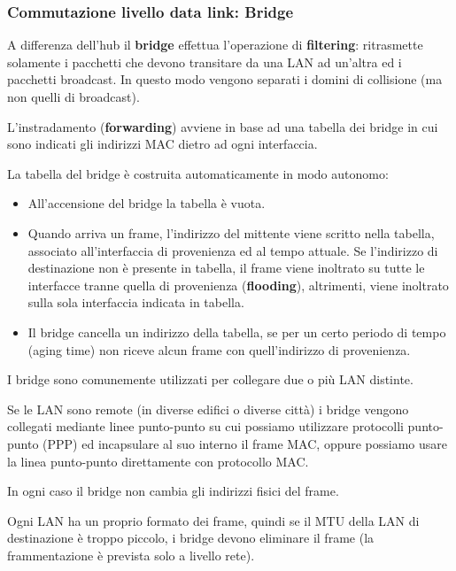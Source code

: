        \subsubsection{Commutazione livello data link: Bridge}
            A differenza dell'hub il \textbf{bridge} effettua l'operazione di \textbf{filtering}: ritrasmette solamente i pacchetti che devono transitare da una LAN ad un'altra ed i pacchetti broadcast. In questo modo vengono separati i domini di collisione (ma non quelli di broadcast).
        
            L'instradamento (\textbf{forwarding}) avviene in base ad una tabella dei bridge in cui sono indicati gli indirizzi MAC dietro ad ogni interfaccia.

            

            La tabella del bridge è costruita automaticamente in modo autonomo:
            \begin{itemize}
                \item All'accensione del bridge la tabella è vuota.
                \item Quando arriva un frame, l'indirizzo del mittente viene scritto nella tabella, associato all'interfaccia di provenienza ed al tempo attuale. Se l'indirizzo di destinazione non è presente in tabella, il frame viene inoltrato su tutte le interfacce tranne quella di provenienza (\textbf{flooding}), altrimenti, viene inoltrato sulla sola interfaccia indicata in tabella.
                \item Il bridge cancella un indirizzo della tabella, se per un certo periodo di tempo (aging time) non riceve alcun frame con quell'indirizzo di provenienza.
            \end{itemize}

            I bridge sono comunemente utilizzati per collegare due o più LAN distinte.

            Se le LAN sono remote (in diverse edifici o diverse città) i bridge vengono collegati mediante linee punto-punto su cui possiamo utilizzare protocolli punto-punto (PPP) ed incapsulare al suo interno il frame MAC, oppure possiamo usare la linea punto-punto direttamente con protocollo MAC.

            In ogni caso il bridge non cambia gli indirizzi fisici del frame.

            Ogni LAN ha un proprio formato dei frame, quindi se il MTU della LAN di destinazione è troppo piccolo, i bridge devono eliminare il frame (la frammentazione è prevista solo a livello rete).

